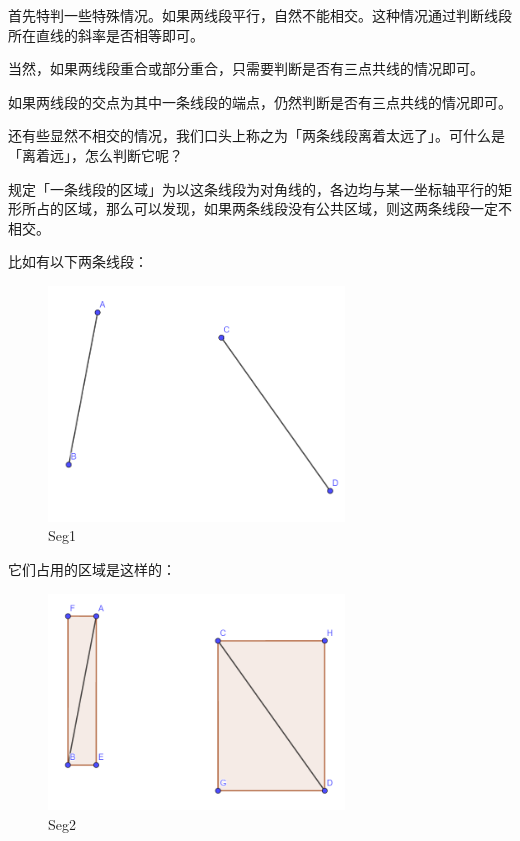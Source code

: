 首先特判一些特殊情况。如果两线段平行，自然不能相交。这种情况通过判断线段所在直线的斜率是否相等即可。

当然，如果两线段重合或部分重合，只需要判断是否有三点共线的情况即可。

如果两线段的交点为其中一条线段的端点，仍然判断是否有三点共线的情况即可。

还有些显然不相交的情况，我们口头上称之为「两条线段离着太远了」。可什么是「离着远」，怎么判断它呢？

规定「一条线段的区域」为以这条线段为对角线的，各边均与某一坐标轴平行的矩形所占的区域，那么可以发现，如果两条线段没有公共区域，则这两条线段一定不相交。

比如有以下两条线段：

\begin{figure}[htbp]
\centering
\includegraphics[width=0.7\textwidth]{docs/geometry/images/2d-seg1.png} 
\caption{Seg1}
\end{figure}

它们占用的区域是这样的：

\begin{figure}[htbp]
\centering
\includegraphics[width=0.7\textwidth]{docs/geometry/images/2d-seg2.png} 
\caption{Seg2}
\end{figure}

